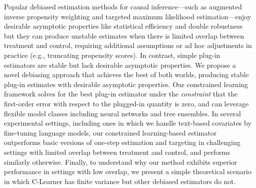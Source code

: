 
Popular debiased estimation methods for causal inference---such as augmented inverse propensity weighting and targeted maximum likelihood estimation---enjoy desirable asymptotic properties like statistical efficiency and double robustness but  they 
can produce unstable estimates when there is limited overlap between treatment and control, requiring additional assumptions or ad hoc adjustments in practice (e.g., truncating propensity scores). 
In contrast, 
simple plug-in estimators are stable but lack desirable asymptotic properties. 
We propose a novel debiasing approach that achieves the best of both worlds, producing stable plug-in estimates with desirable asymptotic properties. Our constrained learning framework solves for the best plug-in estimator under the \emph{constraint} that the first-order error with respect to the plugged-in quantity is zero, and can leverage flexible model classes including neural networks and tree ensembles. In several experimental settings, including ones in which we handle text-based covariates by fine-tuning language models, our constrained learning-based estimator outperforms basic versions of one-step estimation and targeting in challenging settings with limited overlap between treatment and control, and performs similarly otherwise.
Finally, to understand why our method exhibits superior performance in settings with low overlap, 
we present %
a simple theoretical scenario in which C-Learner has finite variance but other debiased estimators do not. %








